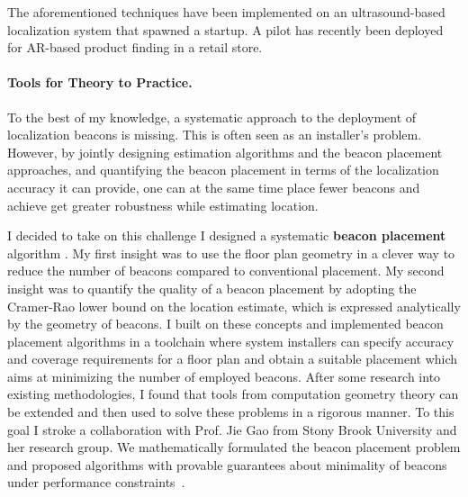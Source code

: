 \documentclass[10pt]{article}
\begin{document}
The aforementioned techniques have been implemented on an ultrasound-based localization system that spawned a startup. A pilot has recently been deployed for AR-based product finding in a retail store. 




\paragraph{Tools for Theory to Practice.  }
To the best of my knowledge, a systematic approach to the deployment of localization beacons is missing. This is often seen as an installer's problem. 
However, by jointly designing estimation algorithms and the beacon placement approaches, and quantifying the beacon placement in terms of the localization accuracy it can provide, one can at the same time place fewer beacons and achieve get greater robustness while estimating location.

I decided to take on this challenge I designed a systematic {\bf beacon placement} algorithm \cite{rajagopal2016beacon}. 
My first insight was to use the floor plan geometry in a clever way to reduce the number of beacons compared to conventional placement. 
My second insight was to quantify the quality of a beacon placement by adopting the Cramer-Rao lower bound on the location estimate, which is expressed analytically by the geometry of beacons. I built on these concepts and implemented beacon placement algorithms in a toolchain where system installers can specify accuracy and coverage requirements for a floor plan and obtain a suitable placement which aims at minimizing the number of employed beacons.
After some research into existing methodologies, I found that tools from computation geometry theory can be extended and then used to solve these problems in a rigorous manner.  To this goal I stroke a collaboration with Prof. Jie Gao from Stony Brook University and her research group. We mathematically formulated the beacon placement problem and proposed algorithms with provable guarantees about minimality of beacons under performance constraints~\cite{beaconplacementtheory}.  
\end{document}
